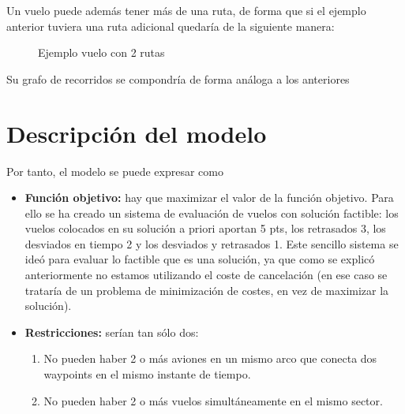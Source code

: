 Un vuelo puede además tener más de una ruta, de forma que si el ejemplo anterior tuviera una ruta adicional quedaría de la siguiente manera:
\begin{figure}[H]
	\centering
	
	\caption{Ejemplo vuelo con 2 rutas}
	\label{fig: Ejemplo vuelo con 2 rutas}
\end{figure}

Su grafo de recorridos se compondría de forma análoga a los anteriores

\section{Descripción del modelo}
Por tanto, el modelo se puede expresar como
\begin{itemize}
	\item \textbf{Función objetivo: }hay que maximizar el valor de la función objetivo. Para ello se ha creado un sistema de evaluación de vuelos con solución factible: los vuelos colocados en su solución a priori aportan 5 pts, los retrasados 3, los desviados en tiempo 2 y los desviados y retrasados 1. Este sencillo sistema se ideó para evaluar lo factible que es una solución, ya que como se explicó anteriormente no estamos utilizando el coste de cancelación (en ese caso se trataría de un problema de minimización de costes, en vez de maximizar la solución).
	\item \textbf{Restricciones:} serían tan sólo dos:
	\begin{enumerate}
		\item No pueden haber 2 o más aviones en un mismo arco que conecta dos waypoints en el mismo instante de tiempo.
		\item No pueden haber 2 o más vuelos simultáneamente en el mismo sector.
	\end{enumerate}
	
	
\end{itemize}
